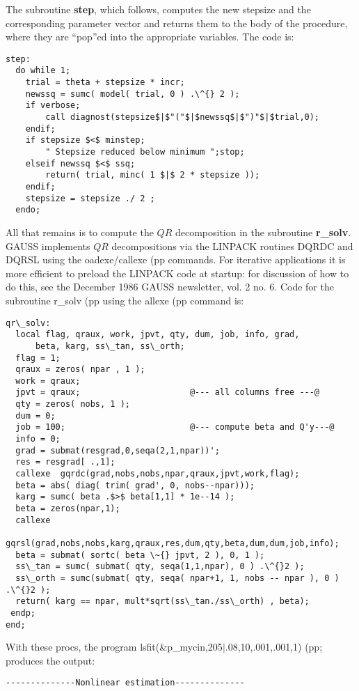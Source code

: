 {The subroutine {\bf step}, which follows, computes the new
stepsize and
the corresponding parameter  vector and  returns them  to the  body of
the procedure, where they are ``pop''ed into the appropriate variables.
The code is:
\begin{verbatim}
step:
  do while 1;
    trial = theta + stepsize * incr;
    newssq = sumc( model( trial, 0 ) .\^{} 2 );
    if verbose;
        call diagnost(stepsize$|$"("$|$newssq$|$")"$|$trial,0);
    endif;
    if stepsize $<$ minstep;
        " Stepsize reduced below minimum ";stop;
    elseif newssq $<$ ssq;
        return( trial, minc( 1 $|$ 2 * stepsize ));
    endif;
    stepsize = stepsize ./ 2 ;
  endo;
\end{verbatim}



All that remains is to compute the $QR$ decomposition in the subroutine
{\bf r\_solv}.  GAUSS implements $QR$
decompositions via the LINPACK routines \cite{dong:bunc:mole:stew:1979}
DQRDC and DQRSL using the
oadexe/callexe\rm%
(pp commands.  For iterative applications
it is more efficient to preload the LINPACK code at startup:
for discussion of how to do this, see the December 1986 GAUSS
newsletter, vol. 2 no. 6.  Code for the subroutine
r\_solv\rm%
(pp using the allexe\rm%
(pp command is:
\begin{verbatim}
qr\_solv:
  local flag, qraux, work, jpvt, qty, dum, job, info, grad,
      beta, karg, ss\_tan, ss\_orth;
  flag = 1;
  qraux = zeros( npar , 1 );
  work = qraux;
  jpvt = qraux;                      @--- all columns free ---@
  qty = zeros( nobs, 1 );
  dum = 0;
  job = 100;                         @--- compute beta and Q'y---@
  info = 0;
  grad = submat(resgrad,0,seqa(2,1,npar))';
  res = resgrad[ .,1];
  callexe  gqrdc(grad,nobs,nobs,npar,qraux,jpvt,work,flag);
  beta = abs( diag( trim( grad', 0, nobs--npar)));
  karg = sumc( beta .$>$ beta[1,1] * 1e--14 );
  beta = zeros(npar,1);
  callexe
      gqrsl(grad,nobs,nobs,karg,qraux,res,dum,qty,beta,dum,dum,job,info);
  beta = submat( sortc( beta \~{} jpvt, 2 ), 0, 1 );
  ss\_tan = sumc( submat( qty, seqa(1,1,npar), 0 ) .\^{}2 );
  ss\_orth = sumc(submat( qty, seqa( npar+1, 1, nobs -- npar ), 0 ) .\^{}2 );
  return( karg == npar, mult*sqrt(ss\_tan./ss\_orth) , beta);
 endp;
end;
\end{verbatim}
With these procs, the program
lsfit(\&p\_mycin,205$|$.08,10,.001,.001,1)\rm%
(pp; produces the
output:
\begin{verbatim}
--------------Nonlinear estimation--------------
 

\end{verbatim}}
